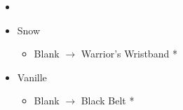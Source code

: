 \begin{menu}
\begin{multicols}{2}
\begin{itemize}
\begin{itemize}
        \item {}%
{\paradigmline{\com}{(\com)}{(\com)}}%
{\paradigmline[2]{\textit{\com}}{\textit{(\com)}}{\textit{(\com)}}}%
{\paradigmline{\syn}{\sen}{(\sab)}}%
{\paradigmline{[\syn]}{\rav}{(\med)}}%
{\paradigmline{\rav}{\rav}{[\med]}}%
{\paradigmline{\rav}{\rav}{[\rav]}}
    \end{itemize}
    \equip
    \begin{itemize}
        \item Snow
        \begin{itemize}
            \item Blank $\rightarrow$ Warrior's Wristband *
        \end{itemize}
        \item Vanille
        \begin{itemize}
            \item Blank $\rightarrow$ Black Belt * 
        \end{itemize}
    \end{itemize}
\end{itemize}
\end{multicols}
\end{menu}

\renewcommand{\first}{[1] Cerberus (\com/\com/\com)}
\renewcommand{\second}{[2] Cerberus (\com/\com/\com)}
\renewcommand{\third}{[3] Premeditation (\syn/\sen/\sab)}
\renewcommand{\fourth}{[4] Coordination (\syn/\rav/\med)}
\renewcommand{\fifth}{[5] Thaumaturgy (\rav/\rav/\med)}
\renewcommand{\sixth}{[6] Tri-Disaster (\rav/\rav/\rav)}

